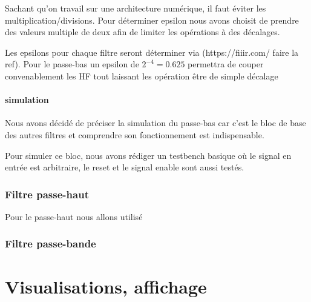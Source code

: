 \documentclass{article}
\begin{document}
    Sachant qu'on travail sur une architecture numérique, il faut éviter les multiplication/divisions. Pour déterminer epsilon nous avons choisit de prendre des valeurs multiple de deux afin de limiter les opérations à des décalages.
    
    Les epsilons pour chaque filtre seront déterminer via (https://fiiir.com/ faire la ref). Pour le passe-bas un epsilon de $2^{-4}=0.625$ permettra de couper convenablement les HF tout laissant les opération être de simple décalage
    \subsection{simulation}
	Nous avons décidé de préciser la simulation du passe-bas car c'est le bloc de base des autres filtres et comprendre son fonctionnement est indispensable.
    
    Pour simuler ce bloc, nous avons rédiger un testbench basique où le signal en entrée est arbitraire, le reset et le signal enable sont aussi testés.
    
	
    \section{Filtre passe-haut}
    Pour le passe-haut nous allons utilisé 
    \section{Filtre passe-bande}
    \part{Visualisations, affichage}
\end{document}
